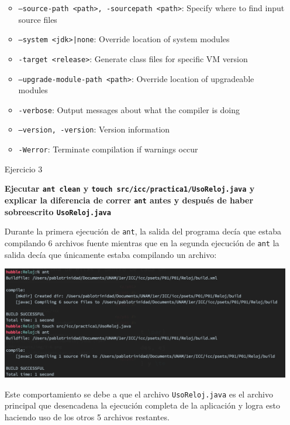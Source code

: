 \documentclass[11pt,letterpaper]{article}
\begin{document}
\begin{enumerate}
\begin{itemize}
            \item \texttt{--source-path <path>, -sourcepath <path>}: Specify where to find input source files
            \item \texttt{--system <jdk>|none}: Override location of system modules
            \item \texttt{-target <release>}: Generate class files for specific VM version
            \item \texttt{--upgrade-module-path <path>}: Override location of upgradeable modules
            \item \texttt{-verbose}: Output messages about what the compiler is doing
            \item \texttt{--version, -version}: Version information
            \item \texttt{-Werror}: Terminate compilation if warnings occur
        \end{itemize}

    \item [Ejercicio 3] {\bfseries Ejecutar \texttt{ant clean} y
        \texttt{touch src/icc/practica1/UsoReloj.java} y explicar la diferencia
        de correr \texttt{ant} antes y después de haber sobreescrito \texttt{UsoReloj.java}\par}

        Durante la primera ejecución de \texttt{ant}, la salida del programa decía que
        estaba compilando 6 archivos fuente mientras que en la segunda ejecución de
        \texttt{ant} la salida decía que únicamente estaba compilando un archivo:

        \begin{center}
            \includegraphics[scale=.5]{assets/img/canek-e-3.png}
        \end{center}

        Este comportamiento se debe a que el archivo \texttt{UsoReloj.java} es
        el archivo principal que desencadena la ejecución completa de la aplicación
        y logra esto haciendo uso de los otros 5 archivos restantes.


\end{enumerate}
\end{document}
